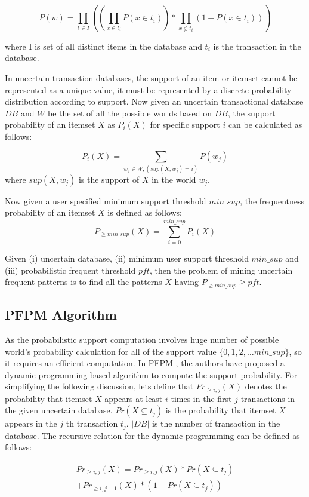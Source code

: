 \[
P(w) = \prod_{t \in I} (( \prod_{x \in t_i} P(x \in t_i)) * \prod_{x \notin t_i} ( 1 - P(x \in t_i)))
\]

where I is set of all distinct items in the database and $t_i$ is the transaction in the database.

In uncertain transaction databases, the support of an item or itemset cannot be represented as a unique value, it must be represented by a discrete probability distribution according to support. Now given an uncertain transactional database $DB$ and  $W$ be the set of all the possible worlds based on $DB$, the support probability of an itemset $X$ as $P_i(X)$ for specific support $i$ can be calculated as follows:

\[
P_i(X) = \sum_{w_j \in W, (sup(X, w_j)=i)} P(w_j)
\]
where $sup(X,w_j)$ is the support of $X$ in the world $w_j$.

Now given a user specified minimum support threshold $min\_sup$, the frequentness probability of an itemset $X$ is defined as follows:
\[
P_{\geq min\_sup} (X) = \sum_{i=0}^{min\_sup} P_i(X)
\] 

Given (i) uncertain database, (ii) minimum user support threshold $min\_sup$ and (iii) probabilistic frequent threshold $pft$, then the problem of mining uncertain frequent patterns is to find all the patterns $X$ having $P_{\geq min\_sup} \geq pft$.

\subsection{PFPM Algorithm}
As the probabilistic support computation involves huge number of possible world's probability calculation for all of the support value $\{0,1,2, \ldots min\_sup\}$, so it requires an efficient computation. In PFPM \cite{pfpm}, the authors have proposed a dynamic programming based algorithm to compute the support probability. For simplifying the following discussion, lets define that $Pr_{\geq i,j}(X)$  denotes the probability that itemset $X$ appears at least $i$ times in the first $j$  transactions in the given uncertain database. $Pr(X \subseteq t_j)$ is the probability that itemset $X$ appears in the $j$ th transaction $t_j$. $|DB|$ is the number of transaction in the database. The recursive relation for the dynamic programming can be defined as follows:

\[
\begin{aligned}
Pr_{\geq i,j}(X)=Pr_{\geq i,j}(X)*Pr(X \subseteq t_j) \\
+ Pr_{\geq i,j-1}(X)*(1-Pr(X \subseteq t_j))
\end{aligned}
\]

